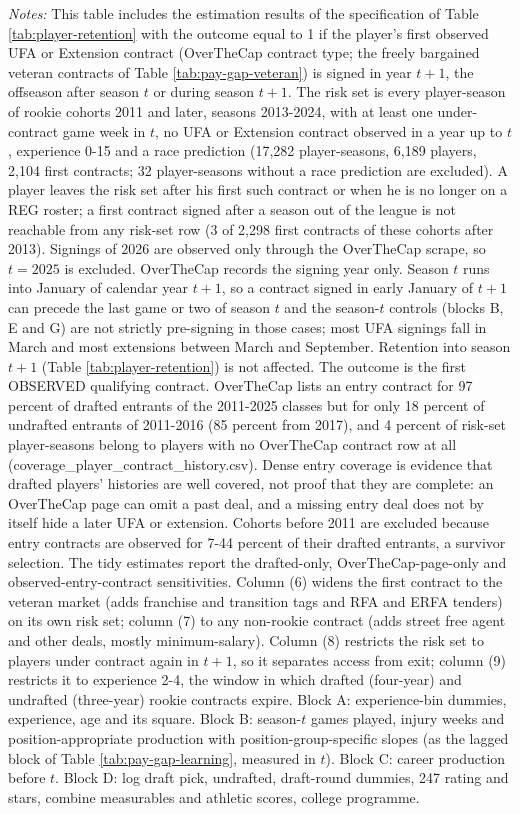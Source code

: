 {\footnotesize
\noindent\textit{Notes:} This table includes the estimation results of the specification of Table \ref{tab:player-retention} with the outcome equal to 1 if the player's first observed UFA or Extension contract (OverTheCap contract type; the freely bargained veteran contracts of Table \ref{tab:pay-gap-veteran}) is signed in year $t+1$, the offseason after season $t$ or during season $t+1$. The risk set is every player-season of rookie cohorts 2011 and later, seasons 2013-2024, with at least one under-contract game week in $t$, no UFA or Extension contract observed in a year up to $t$, experience 0-15 and a race prediction (17,282 player-seasons, 6,189 players, 2,104 first contracts; 32 player-seasons without a race prediction are excluded). A player leaves the risk set after his first such contract or when he is no longer on a REG roster; a first contract signed after a season out of the league is not reachable from any risk-set row (3 of 2,298 first contracts of these cohorts after 2013). Signings of 2026 are observed only through the OverTheCap scrape, so $t = 2025$ is excluded. OverTheCap records the signing year only. Season $t$ runs into January of calendar year $t+1$, so a contract signed in early January of $t+1$ can precede the last game or two of season $t$ and the season-$t$ controls (blocks B, E and G) are not strictly pre-signing in those cases; most UFA signings fall in March and most extensions between March and September. Retention into season $t+1$ (Table \ref{tab:player-retention}) is not affected. The outcome is the first OBSERVED qualifying contract. OverTheCap lists an entry contract for 97 percent of drafted entrants of the 2011-2025 classes but for only 18 percent of undrafted entrants of 2011-2016 (85 percent from 2017), and 4 percent of risk-set player-seasons belong to players with no OverTheCap contract row at all (coverage\_player\_contract\_history.csv). Dense entry coverage is evidence that drafted players' histories are well covered, not proof that they are complete: an OverTheCap page can omit a past deal, and a missing entry deal does not by itself hide a later UFA or extension. Cohorts before 2011 are excluded because entry contracts are observed for 7-44 percent of their drafted entrants, a survivor selection. The tidy estimates report the drafted-only, OverTheCap-page-only and observed-entry-contract sensitivities. Column (6) widens the first contract to the veteran market (adds franchise and transition tags and RFA and ERFA tenders) on its own risk set; column (7) to any non-rookie contract (adds street free agent and other deals, mostly minimum-salary). Column (8) restricts the risk set to players under contract again in $t+1$, so it separates access from exit; column (9) restricts it to experience 2-4, the window in which drafted (four-year) and undrafted (three-year) rookie contracts expire. Block A: experience-bin dummies, experience, age and its square. Block B: season-$t$ games played, injury weeks and position-appropriate production with position-group-specific slopes (as the lagged block of Table \ref{tab:pay-gap-learning}, measured in $t$). Block C: career production before $t$. Block D: log draft pick, undrafted, draft-round dummies, 247 rating and stars, combine measurables and athletic scores, college programme. }
